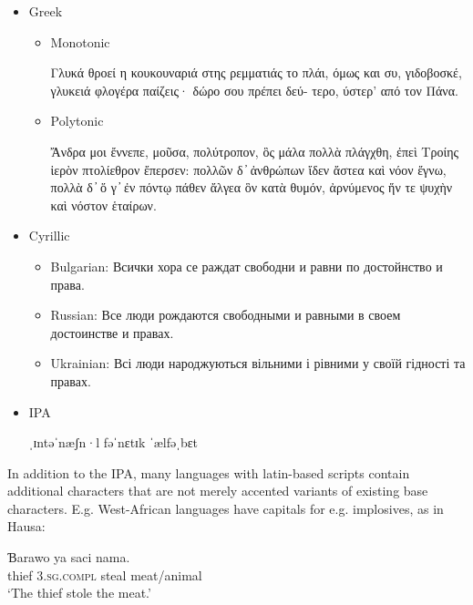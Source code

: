 \documentclass[12pt,a4paper]{article}
\begin{document}
\begin{itemize}
\item Greek 

  \begin{itemize}

  \item Monotonic
    
    Γλυκά θροεί η κουκουναριά στης ρεμματιάς το πλάι, όμως και συ,
    γιδοβοσκέ, γλυκειά φλογέρα παίζεις· δώρο σου πρέπει δεύ- τερο,
    ύστερ' από τον Πάνα.

\item Polytonic

    Ἄνδρα μοι ἔννεπε, μοῦσα, πολύτροπον, ὃς μάλα πολλὰ πλάγχθη,
    ἐπεὶ Τροίης ἱερὸν πτολίεθρον ἔπερσεν: πολλῶν δ ̓ ἀνθρώπων ἴδεν
    ἄστεα καὶ νόον ἔγνω, πολλὰ δ ̓ ὅ γ ̓ ἐν πόντῳ πάθεν ἄλγεα ὃν κατὰ
    θυμόν, ἀρνύμενος ἥν τε ψυχὴν καὶ νόστον ἑταίρων.
  \end{itemize}
  
   
 \item Cyrillic 
   
   \begin{itemize}
   \item Bulgarian: Всички хора се раждат свободни и равни по
     достойнство и права.
     
     
     
   \item Russian: Все люди рождаются свободными и равными в своем
     достоинстве и правах.
     
   \item Ukrainian:  Всі люди народжуються вільними і рівними у своїй гідності та правах.
     
   \end{itemize}

 \item IPA

   ˌɪntəˈnæʃn·l fəˈnɛtɪk ˈælfəˌbɛt
  
  
 \end{itemize}


In addition to the IPA, many languages with latin-based scripts
contain additional characters that are not merely accented variants of
existing base characters. E.g. West-African languages have capitals
for e.g. implosives, as in Hausa:

\begin{exe}
  \ex \gll Ɓarawo ya saci nama. \\
  thief \textsc{3.sg.compl} steal meat/animal\\
  \glt `The thief stole the meat.'
\end{exe}
\end{document}
